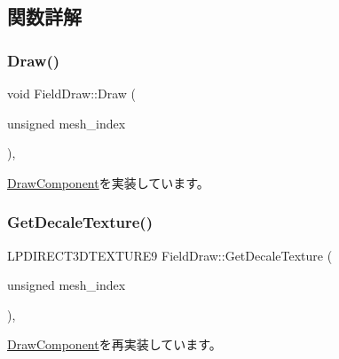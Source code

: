 \subsection{関数詳解}
\mbox{\label{class_field_draw_a78b6bc16f825e91c39fad97931ea63fd}} 
\subsubsection{\texorpdfstring{Draw()}{Draw()}}
{\footnotesize\ttfamily void Field\+Draw\+::\+Draw (\begin{DoxyParamCaption}\item[{unsigned}]{mesh\+\_\+index }\end{DoxyParamCaption})\hspace{0.3cm}{\ttfamily [override]}, {\ttfamily [virtual]}}



\mbox{\hyperlink{class_draw_component_ae84bfb6ccc2fda9e54cdff45057ea2c3}{Draw\+Component}}を実装しています。

\mbox{\label{class_field_draw_a06e1621342d80ea696a5fbf54d5d997b}} 
\subsubsection{\texorpdfstring{Get\+Decale\+Texture()}{GetDecaleTexture()}}
{\footnotesize\ttfamily L\+P\+D\+I\+R\+E\+C\+T3\+D\+T\+E\+X\+T\+U\+R\+E9 Field\+Draw\+::\+Get\+Decale\+Texture (\begin{DoxyParamCaption}\item[{unsigned}]{mesh\+\_\+index }\end{DoxyParamCaption})\hspace{0.3cm}{\ttfamily [override]}, {\ttfamily [virtual]}}



\mbox{\hyperlink{class_draw_component_a9ea98f4bcdfd76782d5234122b132c3d}{Draw\+Component}}を再実装しています。

\mbox{\label{class_field_draw_ae1c720b24a99003a3c413ce0f6dadcb0}} 
